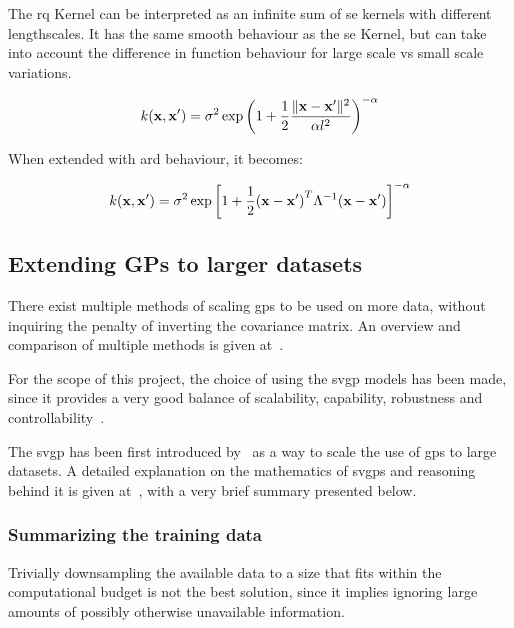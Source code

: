 The \acrfull{rq} Kernel can be interpreted as an infinite sum of \acrshort{se}
kernels with different lengthscales. It has the same smooth behaviour as the
\acrlong{se} Kernel, but can take into account the difference in function
behaviour for large scale vs small scale variations.

\begin{equation}
    k(\mathbf{x}, \mathbf{x'}) = \sigma^2 \exp{\left(1+\frac{1}{2}\frac{\lVert\mathbf{x} -
    \mathbf{x'}\rVert^2}{\alpha l^2}\right)}^{-\alpha}
\end{equation}

When extended with \acrshort{ard} behaviour, it becomes:

\begin{equation}
k(\mathbf{x}, \mathbf{x'})
= \sigma^2\exp{\left[1 + \frac{1}{2} {(\mathbf{x} - \mathbf{x'})}^T \Lambda^{-1}
(\mathbf{x} - \mathbf{x'})\right]}^{-\alpha} \\
\end{equation}



\subsection{Extending GPs to larger datasets}

There exist multiple methods of scaling \acrshort{gp}s to be used on more data,
without inquiring the penalty of inverting the covariance matrix. An overview
and comparison of multiple methods is given
at~\cite{liuUnderstandingComparingScalable2019}.

For the scope of this project, the choice of using the \acrfull{svgp} models has
been made, since it provides a very good balance of scalability, capability,
robustness and controllability~\cite{liuUnderstandingComparingScalable2019}.

The \acrlong{svgp} has been first introduced
by~\textcite{hensmanGaussianProcessesBig2013} as a way to scale the use of
\acrshort{gp}s to large datasets. A detailed explanation on the mathematics of
\acrshort{svgp}s and reasoning behind it is given
at~\cite{yiSparseVariationalGaussian2021}, with a very brief summary presented
below.

\subsubsection{Summarizing the training data}

Trivially downsampling the available data to a size that fits within the
computational budget is not the best solution, since it implies ignoring large
amounts of possibly otherwise unavailable information.

